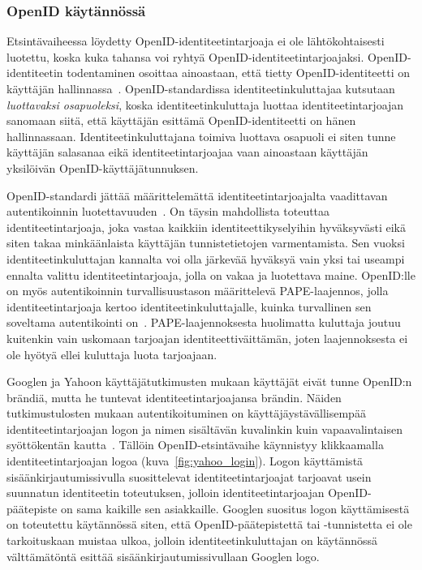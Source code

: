 \documentclass[finnish,gradu]{tktltiki}
\begin{document}
    \subsubsection{OpenID käytännössä} %
    \label{ssub:openid_käytännössä}

    Etsintävaiheessa löydetty OpenID-identiteetintarjoaja ei ole lähtökohtaisesti luotettu, koska kuka tahansa voi ryhtyä OpenID-identi\-teetin\-tarjoajaksi. OpenID-identi\-teetin todentaminen osoittaa ainoastaan, että tietty OpenID-identiteetti on käyttäjän hallinnassa~\cite{openid_2.0_specification_07}. OpenID-standardissa identiteetinkuluttajaa kutsutaan \emph{luottavaksi osapuoleksi}, koska identiteetinkuluttaja luottaa identiteetintarjoajan sanomaan siitä, että käyttäjän esittämä OpenID-identiteetti on hänen hallinnassaan. Identiteetinkuluttajana toimiva luottava osapuoli ei siten tunne käyttäjän salasanaa eikä identiteetintarjoajaa vaan ainoastaan käyttäjän yksilöivän OpenID-käyttäjä\-tunnuksen.

    OpenID-standardi jättää määrittelemättä identiteetintarjoajalta vaadittavan autentikoinnin luotettavuuden~\cite{openid_2.0_specification_07}. On täysin mahdollista toteuttaa identiteetintarjoaja, joka vastaa kaikkiin identiteettikyselyihin hyväksyvästi eikä siten takaa minkäänlaista käyttäjän tunnistetietojen varmentamista. Sen vuoksi identiteetinkuluttajan kannalta voi olla järkevää hyväksyä vain yksi tai useampi ennalta valittu identiteetintarjoaja, jolla on vakaa ja luotettava maine. OpenID:lle on myös autentikoinnin turvallisuustason määrittelevä PAPE-laajennos, jolla identiteetintarjoaja kertoo identiteetinkuluttajalle, kuinka turvallinen sen soveltama autentikointi on~\cite{openid_2.0_pape_07}. PAPE-laajennoksesta huolimatta kuluttaja joutuu kuitenkin vain uskomaan tarjoajan identiteettiväittämän, joten laajennoksesta ei ole hyötyä ellei kuluttaja luota tarjoajaan.

    Googlen ja Yahoon käyttäjätutkimusten mukaan käyttäjät eivät tunne OpenID:n brändiä, mutta he tuntevat identiteetintarjoajansa brändin. Näiden tutkimustulosten mukaan autentikoituminen on käyttäjäystävällisempää identiteetintarjoajan logon ja nimen sisältävän kuvalinkin kuin vapaavalintaisen syöttökentän kautta~\cite{google_usability_federated_login_2008, yahoo_usability_openid_2008, google_thoughts_combining_ux_2008}. Tällöin OpenID-etsintävaihe käynnistyy klikkaamalla identiteetintarjoajan logoa (kuva~\ref{fig:yahoo_login}). Logon käyttämistä sisäänkirjautumissivulla suosittelevat identiteetintarjoajat tarjoavat usein suunnatun identiteetin toteutuksen, jolloin identiteetintarjoajan OpenID-päätepiste on sama kaikille sen asiakkaille. Googlen suositus logon käyttämisestä on toteutettu käytännössä siten, että OpenID-päätepistettä tai -tunnistetta ei ole tarkoituskaan muistaa ulkoa, jolloin identiteetinkuluttajan on käytännössä välttämätöntä esittää sisäänkirjautumissivullaan Googlen logo.
\end{document}
